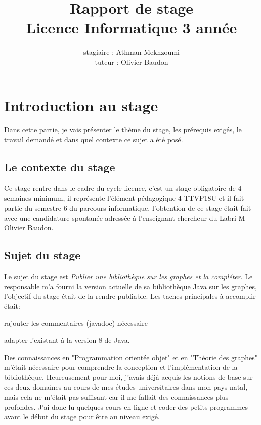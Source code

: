\documentclass[12pt]{report}
\title{Rapport de stage \\
Licence Informatique 3\up{ème} année}
\author{stagiaire : Athman Mekhzoumi\\
tuteur : Olivier Baudon}
\begin{document}
\newpage
\maketitle
\tableofcontents
\newpage

\chapter{Introduction au stage}

Dans cette partie, je vais présenter le thème du stage, les prérequis exigés, le travail demandé et dans quel contexte ce sujet a été posé.

\section{Le contexte du stage}

Ce stage rentre dans le cadre du cycle licence, c'est un stage obligatoire de 4 semaines minimum, il représente l'élément pédagogique 4 TTVP18U et il fait partie du semestre 6 du parcours informatique, l'obtention de ce stage était fait avec une candidature spontanée adressée à l'enseignant-chercheur du Labri M Olivier Baudon. %

\section{Sujet du stage}

Le sujet du stage est \textit{Publier une bibliothèque sur les graphes et la compléter}. Le responsable m'a fourni la version actuelle de sa bibliothèque Java sur les graphes, l'objectif du stage était de la rendre publiable.\newline
Les taches principales à accomplir était:
\begin{enumerat}
\item rajouter les commentaires (javadoc) nécessaire
\item adapter l'existant à la version 8 de Java.
\end{enumerat}

Des connaissances en "Programmation orientée objet" et en "Théorie des graphes" m'était nécessaire pour comprendre la conception et l'implémentation de la bibliothèque. Heureusement pour moi, j'avais déjà acquis les notions de base sur ces deux domaines au cours de mes études universitaires dans mon pays natal, mais cela ne m'était pas suffisant car il me fallait des connaissances plus profondes. J'ai donc lu quelques cours en ligne et coder des petits programmes avant le début du stage pour être au niveau exigé. 
\end{document}
